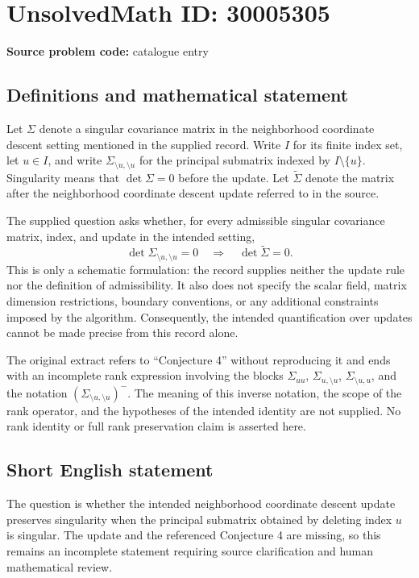 \documentclass[11pt]{article}
\begin{document}
\section*{UnsolvedMath ID: 30005305}
\textbf{Source problem code:} catalogue entry
\subsection{Definitions and mathematical statement}
Let \(\Sigma\) denote a singular covariance matrix in the neighborhood coordinate descent setting mentioned in the supplied record. Write \(I\) for its finite index set, let \(u\in I\), and write \(\Sigma_{\setminus u,\setminus u}\) for the principal submatrix indexed by \(I\setminus\{u\}\). Singularity means that \(\det\Sigma=0\) before the update. Let \(\widetilde\Sigma\) denote the matrix after the neighborhood coordinate descent update referred to in the source.

The supplied question asks whether, for every admissible singular covariance matrix, index, and update in the intended setting,
\[
\det\Sigma_{\setminus u,\setminus u}=0
\quad\Longrightarrow\quad
\det\widetilde\Sigma=0.
\]
This is only a schematic formulation: the record supplies neither the update rule nor the definition of admissibility. It also does not specify the scalar field, matrix dimension restrictions, boundary conventions, or any additional constraints imposed by the algorithm. Consequently, the intended quantification over updates cannot be made precise from this record alone.

The original extract refers to ``Conjecture 4'' without reproducing it and ends with an incomplete rank expression involving the blocks \(\Sigma_{uu}\), \(\Sigma_{u,\setminus u}\), \(\Sigma_{\setminus u,u}\), and the notation \((\Sigma_{\setminus u,\setminus u})^{-}\). The meaning of this inverse notation, the scope of the rank operator, and the hypotheses of the intended identity are not supplied. No rank identity or full rank preservation claim is asserted here.
\subsection{Short English statement}
The question is whether the intended neighborhood coordinate descent update preserves singularity when the principal submatrix obtained by deleting index \(u\) is singular. The update and the referenced Conjecture 4 are missing, so this remains an incomplete statement requiring source clarification and human mathematical review.
\end{document}
